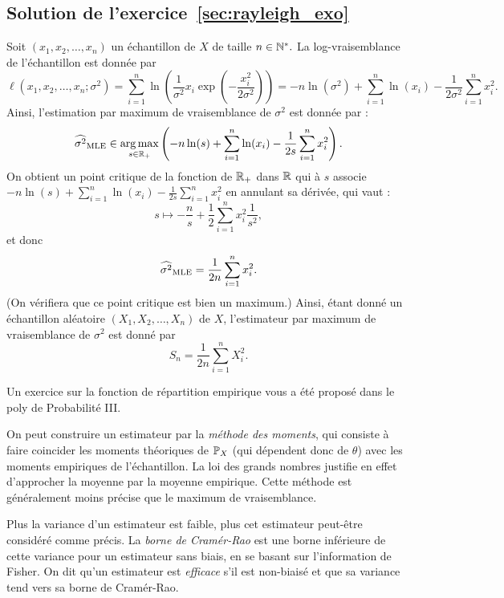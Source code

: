 \subsection{Solution de l'exercice~\ref{sec:rayleigh_exo}}
\label{sec:rayleigh_sol}
Soit $(x_1, x_2, \dots, x_n)$ un échantillon de $X$ de taille $n \in \mathbb{N}^*.$ La
log-vraisemblance de l'échantillon est donnée par
\[
  \ell(x_1, x_2, \dots, x_n; \sigma^2) = \sum_{i=1}^n \ln \left(
    \frac{1}{\sigma^2} x_i \exp\left(- \frac{x_i^2}{2\sigma^2} \right)\right) 
  = -n \ln(\sigma^2) + \sum_{i=1}^n \ln(x_i) - \frac{1}{2\sigma^2} \sum_{i=1}^n x_i^2.
\]
Ainsi, l'estimation par maximum de vraisemblance de $\sigma^2$ est donnée par :
\[
  \widehat{\sigma^2}_{\text{MLE}} \in \operatorname*{arg\,max}_{s \in \mathbb{R}_+} \left(-n \ln(s) + \sum_{i=1}^n \ln(x_i) - 
\frac{1}{2s} \sum_{i=1}^n x_i^2\right).
\]
On obtient un point critique de la fonction de $\mathbb{R}_+$ dans $\mathbb{R}$ qui à $s$
associe $-n \ln(s) + \sum_{i=1}^n \ln(x_i) - \frac{1}{2s} \sum_{i=1}^n x_i^2$
en annulant sa dérivée, qui vaut :
\[
  s \mapsto - \frac{n}{s} + \frac12 \sum_{i=1}^n x_i^2 \frac{1}{s^2},
\]
et donc 
\[
  \widehat{\sigma^2}_{\text{MLE}} = \frac{1}{2n} \sum_{i=1}^n x_i^2.
\]
(On vérifiera que ce point critique est bien un maximum.)
Ainsi, étant donné un échantillon aléatoire $(X_1, X_2, \dots, X_n)$ de $X$,
l'estimateur par maximum de vraisemblance de $\sigma^2$ est donné par
\[
  S_n = \frac{1}{2n} \sum_{i=1}^n X_i^2.
\]


\begin{plusloin}
\item Un exercice sur la fonction de répartition empirique vous a été proposé
  dans le poly de Probabilité III.
\item On peut construire un estimateur par la \textit{méthode des moments}, qui
  consiste à faire coincider les moments théoriques de $\mathbb{P}_X$ (qui dépendent
  donc de $\theta$) avec les moments empiriques de l'échantillon. La loi des
  grands nombres justifie en effet d'approcher la moyenne par la moyenne
  empirique. Cette méthode est généralement moins précise que le maximum de
  vraisemblance.
\item Plus la variance d'un estimateur est faible, plus cet estimateur
  peut-être considéré comme précis. La \textit{borne de Cramér-Rao} est une
  borne inférieure de cette variance pour un estimateur sans biais, en se
  basant sur l'information de Fisher. On dit qu'un estimateur est
  \textit{efficace} s'il est non-biaisé et que sa variance tend vers sa borne
  de Cramér-Rao.
\end{plusloin}






